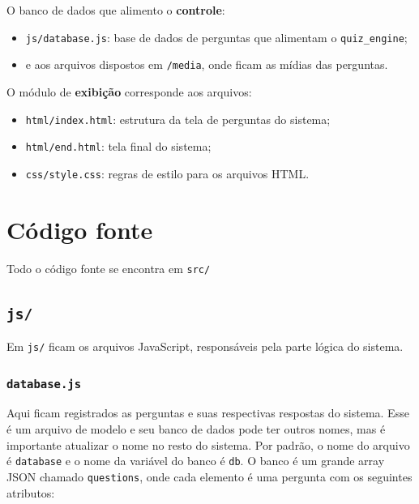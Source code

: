 \documentclass{article}
\begin{document}
O banco de dados que alimento o \textbf{controle}:
\begin{itemize}
\item \texttt{js/database.js}: base de dados de perguntas que alimentam o \texttt{quiz\_engine};
\item e aos arquivos dispostos em \texttt{/media}, onde ficam as mídias das perguntas.\\
\end{itemize}

O módulo de \textbf{exibição} corresponde aos arquivos:
\begin{itemize}
\item \texttt{html/index.html}: estrutura da tela de perguntas do sistema;
\item \texttt{html/end.html}: tela final do sistema;
\item \texttt{css/style.css}: regras de estilo para os arquivos HTML.\\
\end{itemize}

\section{Código fonte}

Todo o código fonte se encontra em \texttt{src/}

\subsection{\texttt{js/}}
Em \texttt{js/} ficam os arquivos JavaScript, responsáveis pela parte lógica do sistema.

\subsubsection{\texttt{database.js}}

Aqui ficam registrados as perguntas e suas respectivas respostas do sistema. Esse é um arquivo de modelo e seu banco de dados pode ter outros nomes, mas é importante atualizar o nome no resto do sistema. Por padrão, o nome do arquivo é \texttt{database} e o nome da variável do banco é \texttt{db}. O banco é um grande array JSON chamado \texttt{questions}, onde cada elemento é uma pergunta com os seguintes atributos:
\end{document}
